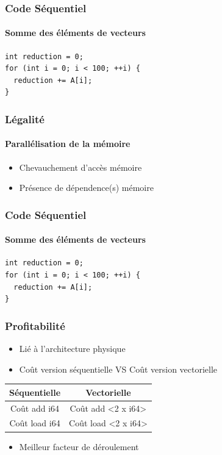 \documentclass{beamer}
\begin{document}
\begin{frame}[fragile]
\frametitle{Code Séquentiel}
\framesubtitle{Somme des éléments de vecteurs}
\begin{lstlisting}
int reduction = 0;
for (int i = 0; i < 100; ++i) {
  reduction += A[i];
}
\end{lstlisting}
\end{frame}

\begin{frame}
\frametitle{Légalité}
\framesubtitle{Parallélisation de la mémoire}
\begin{itemize}
\item Chevauchement d'accès mémoire
\item Présence de dépendence(s) mémoire
\end{itemize}
\end{frame}

\begin{frame}[fragile]
\frametitle{Code Séquentiel}
\framesubtitle{Somme des éléments de vecteurs}
\begin{lstlisting}
int reduction = 0;
for (int i = 0; i < 100; ++i) {
  reduction += A[i];
}
\end{lstlisting}
\end{frame}

\begin{frame}
\frametitle{Profitabilité}
\begin{itemize}
\item Lié à l'architecture physique
\item Coût version séquentielle VS Coût version vectorielle
\end{itemize}

\begin{center}
\begin{tabular}{ | c | c | }
  \hline
  Séquentielle & Vectorielle \\
  \hline
  Coût add i64 & Coût add \textless2 x i64\textgreater \\
  \hline
  Coût load i64 & Coût load \textless2 x i64\textgreater \\
  \hline
\end{tabular}
\end{center}

\begin{itemize}
\item Meilleur facteur de déroulement
\end{itemize}
\end{frame}
\end{document}
